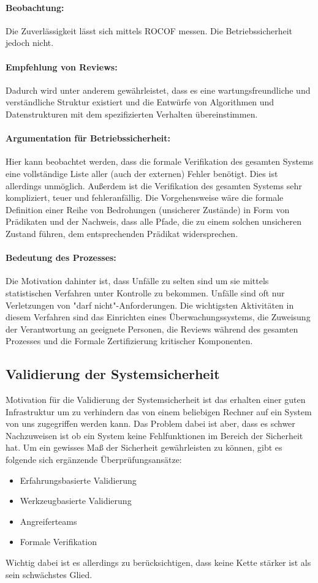 \paragraph{Beobachtung:} Die Zuverlässigkeit lässt sich mittels ROCOF messen. Die Betriebssicherheit jedoch nicht. 

\paragraph{Empfehlung von Reviews:} Dadurch wird unter anderem gewährleistet, dass es eine wartungsfreundliche und verständliche Struktur existiert und die Entwürfe von Algorithmen und Datenstrukturen mit dem spezifizierten Verhalten übereinstimmen.  

\paragraph{Argumentation für Betriebssicherheit:} Hier kann beobachtet werden, dass die formale Verifikation des gesamten Systems eine vollständige Liste aller (auch der externen) Fehler benötigt. Dies ist allerdings unmöglich.  Außerdem ist die Verifikation des gesamten Systems sehr kompliziert, teuer und fehleranfällig. Die Vorgehensweise wäre die formale Definition einer Reihe von Bedrohungen (unsicherer Zustände) in Form von Prädikaten und der Nachweis, dass alle Pfade, die zu einem solchen unsicheren Zustand führen, dem entsprechenden Prädikat widersprechen. 

\paragraph{Bedeutung des Prozesses:} Die Motivation dahinter ist, dass Unfälle zu selten sind um sie mittels statistischen Verfahren unter Kontrolle zu bekommen. Unfälle sind oft nur Verletzungen von "darf nicht"-Anforderungen. Die wichtigsten Aktivitäten in diesem Verfahren sind das Einrichten eines Überwachungssystems, die Zuweisung der Verantwortung an geeignete Personen, die Reviews während des gesamten Prozesses und die Formale Zertifizierung kritischer Komponenten.

\subsection{Validierung der Systemsicherheit}
Motivation für die Validierung der Systemsicherheit  ist das erhalten einer guten Infrastruktur um zu verhindern das von einem beliebigen Rechner auf ein System von uns zugegriffen werden kann. Das Problem dabei ist aber, dass es schwer  Nachzuweisen ist ob ein System keine Fehlfunktionen im Bereich der Sicherheit hat. Um ein gewisses Maß der Sicherheit gewährleisten zu können, gibt es folgende sich ergänzende Überprüfungsansätze:
\begin{itemize}
\item Erfahrungsbasierte Validierung
\item Werkzeugbasierte Validierung
\item Angreiferteams
\item Formale Verifikation
\end{itemize}

Wichtig dabei ist es allerdings zu berücksichtigen, dass keine Kette stärker ist als sein schwächstes Glied.